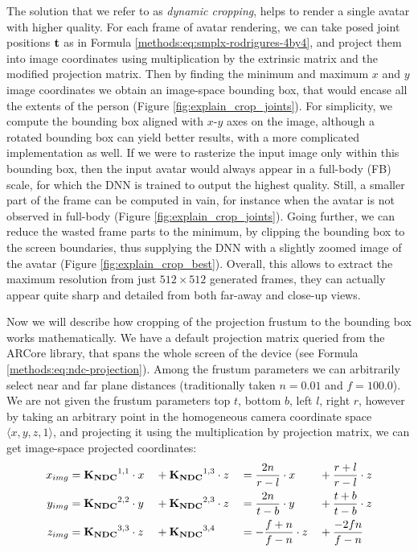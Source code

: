 The solution that we refer to as \textit{dynamic cropping}, helps to render a single avatar with higher quality. For each frame of avatar rendering, we can take posed joint positions $\bm{\mathrm{t}}$ as in Formula \ref{methods:eq:smplx-rodrigures-4by4}, and project them into image coordinates using multiplication by the extrinsic matrix and the modified projection matrix. Then by finding the minimum and maximum $x$ and $y$ image coordinates we obtain an image-space bounding box, that would encase all the extents of the person (Figure \ref{fig:explain_crop_joints}). For simplicity, we compute the bounding box aligned with $x$-$y$ axes on the image, although a rotated bounding box can yield better results, with a more complicated implementation as well. If we were to rasterize the input image only within this bounding box, then the input avatar would always appear in a full-body (FB) scale, for which the DNN is trained to output the highest quality. Still, a smaller part of the frame can be computed in vain, for instance when the avatar is not observed in full-body (Figure \ref{fig:explain_crop_joints}). Going further, we can reduce the wasted frame parts to the minimum, by clipping the bounding box to the screen boundaries, thus supplying the DNN with a slightly zoomed image of the avatar (Figure \ref{fig:explain_crop_best}). Overall, this allows to extract the maximum resolution from just $512 \times 512$ generated frames, they can actually appear quite sharp and detailed from both far-away and close-up views.

Now we will describe how cropping of the projection frustum to the bounding box works mathematically. We have a default projection matrix queried from the ARCore library, that spans the whole screen of the device (see Formula \ref{methods:eq:ndc-projection}). Among the frustum parameters we can arbitrarily select near and far plane distances (traditionally taken $n=0.01$ and $f=100.0$). We are not given the frustum parameters top $t$, bottom $b$, left $l$, right $r$, however by taking an arbitrary point in the homogeneous camera coordinate space $\langle x, y, z, 1 \rangle$, and projecting it using the multiplication by projection matrix, we can get image-space projected coordinates:
\begin{alignat}{4}
	x_{img} &= \bm{\mathrm{K_{NDC}}}^{1,1}\cdot x &&+ \bm{\mathrm{K_{NDC}}}^{1,3}\cdot z &&= \dfrac{2n}{r-l}\cdot x &&+ \dfrac{r + l}{r - l}\cdot z \label{methods:eq:project-coords-x}\\
	y_{img} &= \bm{\mathrm{K_{NDC}}}^{2,2}\cdot y &&+ \bm{\mathrm{K_{NDC}}}^{2,3}\cdot z &&= \dfrac{2n}{t-b}\cdot y &&+ \dfrac{t + b}{t - b}\cdot z  \label{methods:eq:project-coords-y}\\
	z_{img} &= \bm{\mathrm{K_{NDC}}}^{3,3} \cdot z &&+ \bm{\mathrm{K_{NDC}}}^{3,4} &&= -\dfrac{f + n}{f - n}\cdot z &&+ \dfrac{-2fn}{f - n} \label{methods:eq:project-coords-z}	
\end{alignat}

